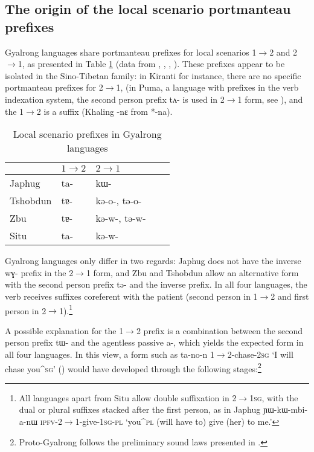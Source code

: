 \documentclass[oldfontcommands,oneside,a4paper,11pt]{article}
\newcommand{\ipa}[1]{{\phon \mbox{#1}}} %
\begin{document}
\subsection{The origin of the local scenario portmanteau prefixes}

Gyalrong languages share portmanteau prefixes for local scenarios 1$\rightarrow$2 and 2$\rightarrow$1, as presented in Table \ref{tab:local.rgy} (data from \citealt[218]{linxr93jiarong}, \citealt{jackson02rentongdengdi}, \citealt{jacques12agreement}, \citealt{gongxun14agreement}). These prefixes appear to be isolated in the Sino-Tibetan family: in Kiranti for instance, there are no specific portmanteau prefixes for 2$\rightarrow$1, (in Puma, a language with prefixes in the verb indexation system, the second person prefix \ipa{tʌ-} is used in 2$\rightarrow$1 form, see \citealt{bickel07puma}), and the 1$\rightarrow$2 is a suffix (Khaling \ipa{-nɛ} from *-na).

\begin{table}
\caption{Local scenario prefixes in Gyalrong languages} \centering \label{tab:local.rgy} 
\begin{tabular}{lllll}
\toprule
& $1\rightarrow2$ & $2\rightarrow1$ \\
\midrule
Japhug &  \ipa{ta-} & \ipa{kɯ-} \\
Tshobdun &  \ipa{tɐ-} & \ipa{kə-o-}, \ipa{tə-o-} \\
Zbu &  \ipa{tɐ-} &\ipa{kə-w-}, \ipa{tə-w-} \\
Situ &  \ipa{ta-} & \ipa{kə-w-} \\
\bottomrule
\end{tabular}
\end{table}

Gyalrong languages only differ in two regards: Japhug does not have the inverse \ipa{wɣ-} prefix in the  2$\rightarrow$1 form, and Zbu and Tshobdun allow an alternative form with the second person prefix \ipa{tə-} and the inverse prefix. In all four languages, the verb receives suffixes coreferent with the patient (second person in 1$\rightarrow$2 and first person in  2$\rightarrow$1).\footnote{All languages apart from Situ allow double suffixation in 2$\rightarrow$\textsc{1sg}, with the dual or plural suffixes stacked after the first person, as in Japhug \ipa{ɲɯ-kɯ-mbi-a-nɯ} \textsc{ipfv}-2$\rightarrow$1-give-\textsc{1sg-pl} `you^{\textsc{pl}} (will have to) give (her) to me.'}

A possible explanation for the 1$\rightarrow$2  prefix is a combination between the second person prefix \ipa{tɯ-} and the agentless passive \ipa{a-}, which yields the expected form in all four languages. In this view, a form such as \ipa{ta-no-n} 1$\rightarrow$2-chase-\textsc{2sg} `I will chase you^{\textsc{sg}}' (\citealt[219]{linxr93jiarong}) would have developed through the following stages:\footnote{Proto-Gyalrong follows the preliminary sound laws presented in \citet{jacques04these}.}
\end{document}
